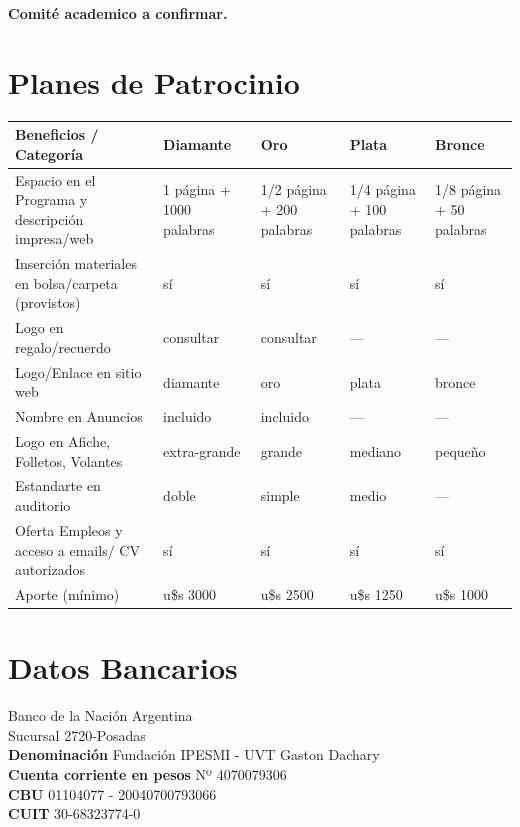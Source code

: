 \documentclass[11pt,a4paper]{report}
\begin{document}
\textbf{Comité academico a confirmar.}

\section*{Planes de Patrocinio}
\begin{center}

\begin{tabular}{|p{4cm}|p{2.5cm}|p{2.5cm}|p{2.5cm}|p{2.5cm}|}
\hline
Beneficios / Categoría & Diamante & Oro  & Plata & Bronce \\
\hline
Espacio en el Programa y descripción impresa/web & 1 página +
1000 palabras & 1/2 página + 200 palabras & 1/4 página + 100 palabras &  1/8 página + 50 palabras\\
\hline
Inserción materiales en bolsa/carpeta (provistos) & sí & sí & sí & sí \\
\hline
Logo en regalo/recuerdo & consultar & consultar & --- & --- \\
\hline
Logo/Enlace en sitio web & diamante & oro & plata & bronce \\
\hline
Nombre en Anuncios & incluido & incluido & --- & --- \\
\hline
Logo en Afiche, Folletos, Volantes & extra-grande & grande & mediano & pequeño \\
\hline
Estandarte en auditorio & doble & simple & medio & --- \\
\hline
Oferta Empleos y acceso a emails/ CV autorizados  & sí & sí & sí & sí \\
\hline
Aporte (mínimo) & u\$s 3000 & u\$s 2500 & u\$s 1250 & u\$s 1000\\
\hline
\end{tabular}
\end{center}

\section*{Datos Bancarios}
\noindent Banco de la Nación Argentina \\
Sucursal 2720-Posadas \\
\textbf{Denominación} Fundación IPESMI - UVT Gaston Dachary \\
\textbf{Cuenta corriente en pesos} Nº 4070079306 \\
\textbf{CBU} 01104077 - 20040700793066 \\
\textbf{CUIT} 30-68323774-0 \\
\end{document}

